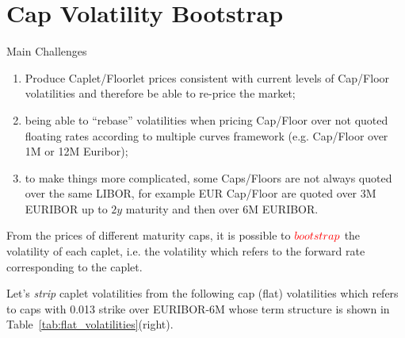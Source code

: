 \documentclass[12pt,a4paper]{article}
\begin{document}
\clearpage
\section{Cap Volatility Bootstrap}

Main Challenges
	\begin{enumerate}
		\item Produce Caplet/Floorlet prices consistent with current levels of Cap/Floor volatilities and therefore be able to re-price the market;
		\item being able to “rebase” volatilities when pricing Cap/Floor over not quoted floating rates according to multiple curves framework (e.g. Cap/Floor over 1M or 12M Euribor);
		\item to make things more complicated, some Caps/Floors are not always quoted over the same LIBOR, for example EUR Cap/Floor are quoted over 3M EURIBOR up to $2y$ maturity and then over 6M EURIBOR.
	\end{enumerate}

From the prices of different maturity caps, it is possible to $\color{red}{bootstrap}$ the volatility of each caplet, i.e. the volatility which refers to the forward rate corresponding to the caplet.

Let's \emph{strip} caplet volatilities from the following cap (flat) volatilities which refers to caps with 0.013 strike over EURIBOR-6M whose term structure is shown in Table~\ref{tab:flat_volatilities}(right).
\end{document}
